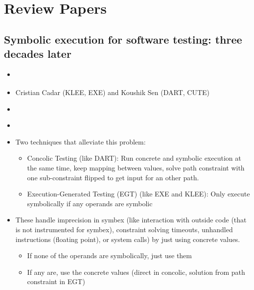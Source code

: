 \documentclass{article}
\begin{document}
\pagebreak
\section{Review Papers}
\subsection{Symbolic execution for software testing: three decades later}
\begin{itemize}
    \item \cite{ReviewThreeDecades}
    \item Cristian Cadar (KLEE\cite{KLEE}, EXE\cite{EXE}) and Koushik Sen (DART\cite{DART}, CUTE\cite{CUTE})
    \item {}\cite{ReviewThreeDecades}
    \item {}\cite{ReviewThreeDecades}
    \item Two techniques that alleviate this problem:
          \begin{itemize}
              \item Concolic Testing (like DART\cite{DART}): Run concrete and symbolic execution at the same time, keep mapping between values, solve path constraint with one sub-constraint flipped to get input for an other path.
              \item Execution-Generated Testing (EGT) (like EXE\cite{EXE} and KLEE\cite{KLEE}): Only execute symbolically if any operands are symbolic
          \end{itemize}
    \item These handle imprecision in symbex (like interaction with outside code (that is not instrumented for symbex), constraint solving timeouts, unhandled instructions (floating point), or system calls) by just using concrete values.
          \begin{itemize}
              \item If none of the operands are symbolically, just use them
              \item If any are, use the concrete values (direct in concolic, solution from path constraint in EGT)

\end{itemize}
\end{itemize}
\end{document}
